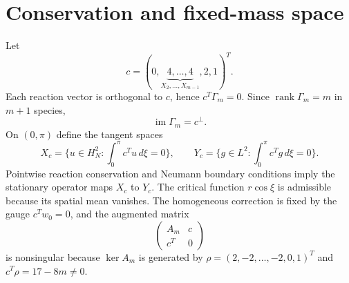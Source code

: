 \section*{Conservation and fixed-mass space}
Let
\[
c=(0,\underbrace{4,\ldots,4}_{X_2,\ldots,X_{m-1}},2,1)^T.
\]
Each reaction vector is orthogonal to $c$, hence $c^T\Gamma_m=0$.  Since $\operatorname{rank}\Gamma_m=m$ in $m+1$ species,
\[
\operatorname{im}\Gamma_m=c^\perp.
\]
On $(0,\pi)$ define the tangent spaces
\[
X_c=\{u\in H_N^2:\int_0^\pi c^Tu\,d\xi=0\},\qquad
Y_c=\{g\in L^2:\int_0^\pi c^Tg\,d\xi=0\}.
\]
Pointwise reaction conservation and Neumann boundary conditions imply the stationary operator maps $X_c$ to $Y_c$.  The critical function $r\cos\xi$ is admissible because its spatial mean vanishes.  The homogeneous correction is fixed by the gauge $c^Tw_0=0$, and the augmented matrix
\[
\begin{pmatrix}A_m&c\\c^T&0\end{pmatrix}
\]
is nonsingular because $\ker A_m$ is generated by $\rho=(2,-2,\ldots,-2,0,1)^T$ and $c^T\rho=17-8m\ne0$.
